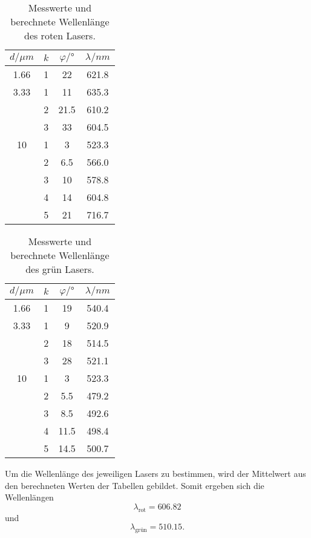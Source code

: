 \begin{table}[H]
  \centering
  \caption{Messwerte und berechnete Wellenlänge des roten Lasers.}
  \label{tab:rot}
  \begin{tabular}{c c c c}
    \toprule
    $d / \mu m$ & $k$ & $ \varphi / °$ & $\lambda / nm$ \\
    \midrule
    1.66 & 1 & 22 & 621.8 \\
    \hline
    3.33 & 1 & 11 & 635.3 \\
         & 2 & 21.5 & 610.2 \\
         & 3 & 33 & 604.5 \\
    \hline
    10   & 1 & 3 & 523.3 \\
         & 2 & 6.5 & 566.0 \\
         & 3 & 10 & 578.8 \\
         & 4 & 14 & 604.8 \\
         & 5 & 21 & 716.7 \\
    \bottomrule
  \end{tabular}
\end{table}

\begin{table}[H]
  \centering
  \caption{Messwerte und berechnete Wellenlänge des grün Lasers.}
  \label{tab:grün}
  \begin{tabular}{c c c c}
    \toprule
    $d / \mu m$ & $k$ & $ \varphi / °$ & $\lambda / nm$ \\
    \midrule
    1.66 & 1 & 19 & 540.4 \\
    \hline
    3.33 & 1 & 9 & 520.9 \\
         & 2 & 18 & 514.5 \\
         & 3 & 28 & 521.1 \\
    \hline
    10   & 1 & 3 & 523.3 \\
         & 2 & 5.5 & 479.2 \\
         & 3 & 8.5 & 492.6 \\
         & 4 & 11.5 & 498.4 \\
         & 5 & 14.5 & 500.7 \\
    \bottomrule
  \end{tabular}
\end{table}

\noindent Um die Wellenlänge des jeweiligen Lasers zu bestimmen, wird der Mittelwert aus den berechneten Werten der Tabellen gebildet.
Somit ergeben sich die Wellenlängen
\begin{equation*}
  \lambda_\text{rot} = 606.82
\end{equation*}
und 
\begin{equation*}
  \lambda_\text{grün} = 510.15.
\end{equation*}